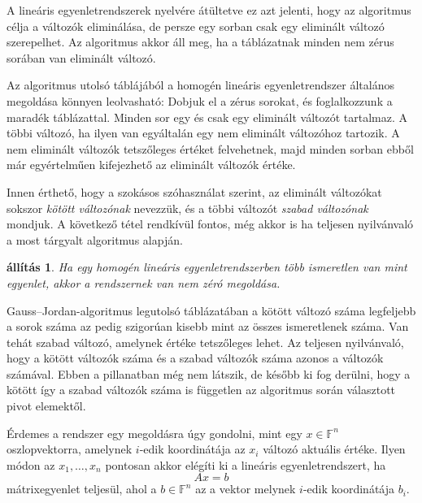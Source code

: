 \documentclass[9pt, a4paper, showtrims]{memoir}
\makeatletter
\renewenvironment{proof}[1][\proofname]
    {\par\pushQED{\qed}%
    \normalfont \topsep6\p@\@plus6\p@\relax
    \trivlist
    \item[\hskip\labelsep
        \itshape
    #1\@addpunct{:}]\ignorespaces}
    {\popQED\endtrivlist\@endpefalse}
\theoremstyle{plain}
\newtheorem{proposition}{állítás}[chapter]
\theoremstyle{remark}
\theoremstyle{definition}
\makeatother
\begin{document}
A lineáris egyenletrendszerek nyelvére átültetve ez azt jelenti, 
hogy az algoritmus célja a változók eliminálása,
de persze egy sorban csak egy eliminált változó szerepelhet.
Az algoritmus akkor áll meg, 
ha a táblázatnak minden nem zérus sorában van eliminált változó.

Az algoritmus utolsó táblájából a homogén lineáris egyenletrendszer általános megoldása könnyen leolvasható:
Dobjuk el a zérus sorokat, és foglalkozzunk a maradék táblázattal.
Minden sor egy és csak egy eliminált változót tartalmaz.
A többi változó, ha ilyen van egyáltalán egy nem eliminált változóhoz tartozik.
A nem eliminált változók tetszőleges értéket felvehetnek, 
majd minden sorban ebből már egyértelműen kifejezhető az eliminált változók értéke.

Innen érthető, 
hogy a szokásos szóhasználat szerint, az eliminált változókat sokszor
\emph{kötött változónak}
nevezzük,
és a többi változót 
\emph{szabad változónak}
mondjuk.
A következő tétel rendkívül fontos, még akkor is ha teljesen nyilvánvaló a most tárgyalt algoritmus alapján.
\begin{proposition}
    Ha egy homogén lineáris egyenletrendszerben több ismeretlen van mint egyenlet,
    akkor a rendszernek van nem zéró megoldása.
\end{proposition}
\begin{proof}
    Gauss--Jordan-algoritmus  legutolsó táblázatában
    a kötött változó száma legfeljebb a sorok száma az pedig szigorúan kisebb mint az összes ismeretlenek száma.
    Van tehát szabad változó, amelynek értéke tetszőleges lehet.
\end{proof}
Az teljesen nyilvánvaló, hogy a kötött változók száma és a szabad változók száma azonos a változók számával.
Ebben a pillanatban még nem látszik,
de később ki fog derülni, 
hogy a kötött így a szabad változók száma is független az algoritmus során választott pivot elemektől.

Érdemes a rendszer egy megoldásra úgy gondolni, mint egy $x\in\mathbb{F}^n$ oszlopvektorra,
amelynek $i$-edik koordinátája az $x_i$ változó aktuális értéke.
Ilyen módon az $x_1,\dots,x_n$ pontosan akkor elégíti ki a lineáris egyenletrendszert,
ha
\[
    Ax=b
\]
mátrixegyenlet teljesül, ahol a $b\in\mathbb{F}^n$ az a vektor melynek $i$-edik koordinátája $b_i$.
\end{document}
